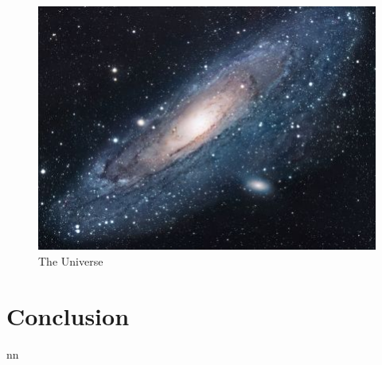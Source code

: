 \documentclass{article}
\begin{document}
\begin{figure}[h!]
\centering
\includegraphics[scale=1.7]{universe}
\caption{The Universe}
\label{fig:universe}
\end{figure}

\section{Conclusion}
nn
\citep{padmanabhanDetectingDarkMatter2005}





\end{document}
